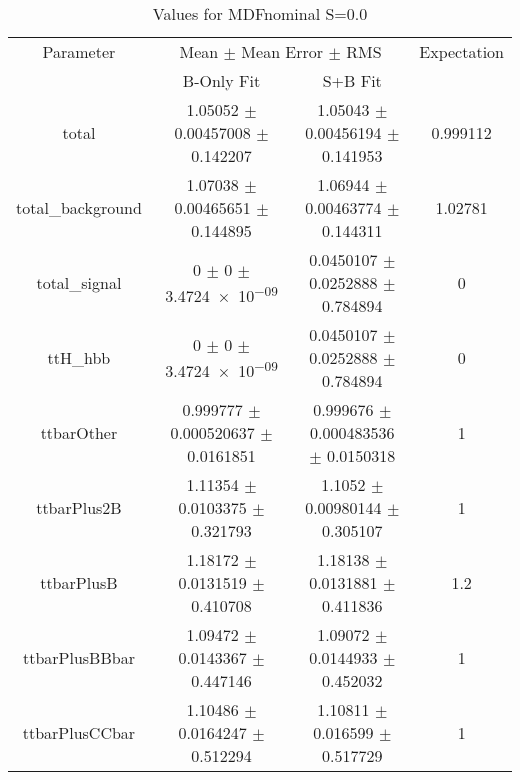 \begin{table}
\centering
\caption{Values for MDFnominal S=0.0}
\begin{tabular}{cccc}
\toprule
Parameter & \multicolumn{2}{c}{Mean $\pm$ Mean Error $\pm$ RMS} & Expectation\\
 & B-Only Fit & S+B Fit & \\
\midrule
total & \num{1.05052} $\pm$ \num{0.00457008} $\pm$ \num{0.142207} & \num{1.05043} $\pm$ \num{0.00456194} $\pm$ \num{0.141953} & \num{0.999112}\\
total\_background & \num{1.07038} $\pm$ \num{0.00465651} $\pm$ \num{0.144895} & \num{1.06944} $\pm$ \num{0.00463774} $\pm$ \num{0.144311} & \num{1.02781}\\
total\_signal & \num{0} $\pm$ \num{0} $\pm$ \num{3.4724e-09} & \num{0.0450107} $\pm$ \num{0.0252888} $\pm$ \num{0.784894} & \num{0}\\
ttH\_hbb & \num{0} $\pm$ \num{0} $\pm$ \num{3.4724e-09} & \num{0.0450107} $\pm$ \num{0.0252888} $\pm$ \num{0.784894} & \num{0}\\
ttbarOther & \num{0.999777} $\pm$ \num{0.000520637} $\pm$ \num{0.0161851} & \num{0.999676} $\pm$ \num{0.000483536} $\pm$ \num{0.0150318} & \num{1}\\
ttbarPlus2B & \num{1.11354} $\pm$ \num{0.0103375} $\pm$ \num{0.321793} & \num{1.1052} $\pm$ \num{0.00980144} $\pm$ \num{0.305107} & \num{1}\\
ttbarPlusB & \num{1.18172} $\pm$ \num{0.0131519} $\pm$ \num{0.410708} & \num{1.18138} $\pm$ \num{0.0131881} $\pm$ \num{0.411836} & \num{1.2}\\
ttbarPlusBBbar & \num{1.09472} $\pm$ \num{0.0143367} $\pm$ \num{0.447146} & \num{1.09072} $\pm$ \num{0.0144933} $\pm$ \num{0.452032} & \num{1}\\
ttbarPlusCCbar & \num{1.10486} $\pm$ \num{0.0164247} $\pm$ \num{0.512294} & \num{1.10811} $\pm$ \num{0.016599} $\pm$ \num{0.517729} & \num{1}\\
\bottomrule
\end{tabular}
\end{table}